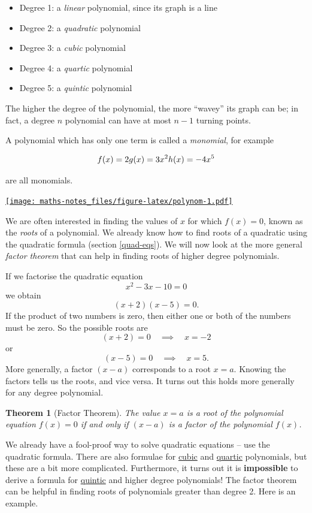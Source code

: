 \documentclass[
]{book}
\providecommand{\tightlist}{%
  \setlength{\itemsep}{0pt}\setlength{\parskip}{0pt}}
\newtheorem{theorem}{Theorem}[chapter]
\theoremstyle{definition}
\theoremstyle{definition}
\theoremstyle{definition}
\theoremstyle{definition}
\theoremstyle{remark}
\begin{document}
\begin{itemize}
\tightlist
\item
  Degree 1: a \emph{linear} polynomial, since its graph is a line
\item
  Degree 2: a \emph{quadratic} polynomial
\item
  Degree 3: a \emph{cubic} polynomial
\item
  Degree 4: a \emph{quartic} polynomial
\item
  Degree 5: a \emph{quintic} polynomial
\end{itemize}

The higher the degree of the polynomial, the more ``wavey'' its graph can be; in fact, a degree \(n\) polynomial can have at most \(n-1\) turning points.

A polynomial which has only one term is called a \emph{monomial}, for example

\[f(x)=2\\
g(x)=3x^2\\
h(x)=-4x^5
\]

are all monomials.

\href{https://www.desmos.com/calculator/fxiq9a83fp}{\texttt{[image: maths-notes\_files/figure-latex/polynom-1.pdf]}}

We are often interested in finding the values of \(x\) for which \(f(x)=0\), known as the \emph{roots} of a polynomial. We already know how to find roots of a quadratic using the quadratic formula (section \ref{quad-eqs}). We will now look at the more general \emph{factor theorem} that can help in finding roots of higher degree polynomials.

If we factorise the quadratic equation
\[x^2-3x-10=0\]
we obtain
\[(x+2)(x-5)=0.\]
If the product of two numbers is zero, then either one or both of the numbers must be zero. So the possible roots are
\[(x+2)=0 \quad \implies\quad x=-2\]
or
\[(x-5)=0\quad \implies\quad x=5.\]
More generally, a factor \((x-a)\) corresponds to a root \(x=a\). Knowing the factors tells us the roots, and vice versa. It turns out this holds more generally for any degree polynomial.

\begin{theorem}[Factor Theorem]
\protect\hypertarget{thm:factors}{}\label{thm:factors}The value \(x=a\) is a root of the polynomial equation \(f(x)=0\) if and only if \((x-a)\) is a factor of the polynomial \(f(x)\).
\end{theorem}

We already have a fool-proof way to solve quadratic equations -- use the quadratic formula. There are also formulae for \href{https://en.wikipedia.org/wiki/Cubic_equation\#General_cubic_formula}{cubic} and \href{https://en.wikipedia.org/wiki/Quartic_equation\#The_general_case}{quartic} polynomials, but these are a bit more complicated. Furthermore, it turns out it is \textbf{impossible} to derive a formula for \href{https://en.wikipedia.org/wiki/Abel\%E2\%80\%93Ruffini_theorem}{quintic} and higher degree polynomials! The factor theorem can be helpful in finding roots of polynomials greater than degree 2. Here is an example.
\end{document}
